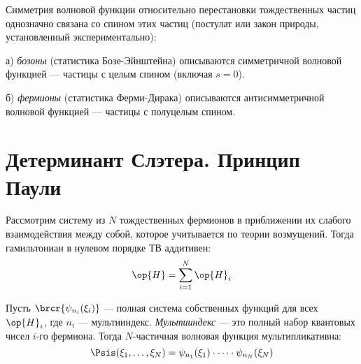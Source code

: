 Симметрия волновой функции относительно перестановки тождественных частиц однозначно связана со спином этих частиц (постулат или закон природы, установленный экспериментально):

а) {\em бозоны} (статистика Бозе-Эйнштейна\footnotemark{}) описываются симметричной волновой функцией --- частицы с целым спином (включая $s = 0$).

б) {\em фермионы} (статистика Ферми-Дирака) описываются антисимметричной волновой функцией --- частицы с полуцелым спином.

\section{Детерминант Слэтера. Принцип Паули}

Рассмотрим систему из $N$ тождественных фермионов в приближении их слабого взаимодействия между собой, которое учитывается по теории возмущений. Тогда гамильтониан в нулевом порядке ТВ аддитивен:
$$
\op{H} = \sum_{i=1}^N\op{H}_i
$$

Пусть $\brcr{\psi_{n_i}(\xi_i)}$ --- полная система собственных функций для всех $\op{H}_i$, где $n_i$ --- мультииндекс. {\em Мультииндекс} --- это полный набор квантовых чисел $i$-го фермиона. Тогда $N$-частичная волновая функция мультипликативна:
\begin{equation}
\label{eq:16_2_1}
\Psis(\xi_1, \dots, \xi_N) = \psi_{n_1}(\xi_1) \cdot \dots \cdot \psi_{n_N}(\xi_N)
\end{equation}

